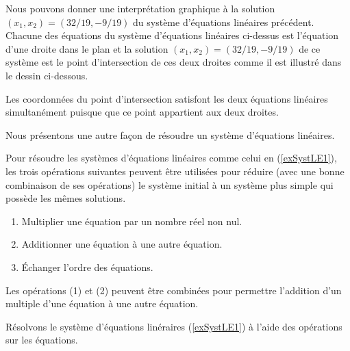 {\begin{egg}
Nous pouvons donner une interprétation graphique à la solution
$(x_1,x_2) = (32/19, -9/19)$ du système d'équations linéaires précédent.
Chacune des équations du système d'équations linéaires ci-dessus est
l'équation d'une droite dans le plan et la solution
$(x_1,x_2) = (32/19, -9/19)$ de ce système est le point d'intersection de
ces deux droites comme il est illustré dans le dessin ci-dessous.

Les coordonnées du point d'intersection satisfont les deux équations
linéaires simultanément puisque que ce point appartient aux deux
droites.
\end{egg}

Nous présentons une autre façon de résoudre un système d'équations
linéaires.

\begin{meth} \label{opOnRows}
Pour résoudre les systèmes d'équations linéaires comme celui en
(\ref{exSystLE1}), les trois opérations suivantes peuvent être
utilisées pour réduire (avec une bonne combinaison de ses opérations)
le système initial à un système plus simple qui possède les mêmes
solutions.
\begin{enumerate}
\item Multiplier une équation par un nombre réel non nul.
\item Additionner une équation à une autre équation.
\item Échanger l'ordre des équations.
\end{enumerate}
\end{meth}

Les opérations (1) et (2) peuvent être combinées pour permettre
l'addition d'un multiple d'une équation à une autre équation.

\begin{egg}
Résolvons le système d'équations linéraires (\ref{exSystLE1}) à l'aide
des opérations sur les équations.


\end{egg}}
